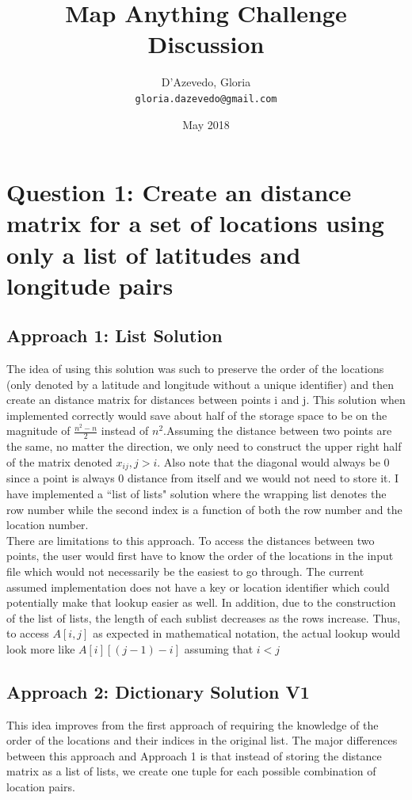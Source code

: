\documentclass{article}
\title{Map Anything Challenge Discussion}
\author{
  D'Azevedo, Gloria\\
  \texttt{gloria.dazevedo@gmail.com}\\
}
\date{May 2018}
\begin{document}
\maketitle

\section{Question 1: Create an distance matrix for a set of locations using only a list of latitudes and longitude pairs}
\subsection{Approach 1: List Solution}
The idea of using this solution was such to preserve the order of the locations (only denoted by a latitude and longitude without a unique identifier) and then create an distance matrix for distances between points i and j.  This solution when implemented correctly would save about half of the storage space to be on the magnitude of $\frac{n^2-n}{2}$ instead of $n^2$.Assuming the distance between two points are the same, no matter the direction, we only need to construct
the upper right half of the matrix denoted $x_{ij}, j>i$.  Also note that the diagonal would always be 0 since a point is always 0 distance from itself and we would not need to store it.  I have implemented a ``list of lists" solution where the wrapping list denotes the row number while the second index is a function of both the row number and the location number.  \\

There are limitations to this approach.  To access the distances between two points, the user would first have to know the order of the locations in the input file which would not necessarily be the easiest to go through.  The current assumed implementation does not have a key or location identifier which could potentially make that lookup easier as well.  In addition, due to the construction of the list of lists, the length of each sublist decreases as the rows increase.  Thus, to access $A[i,j]$ as expected in mathematical notation, the actual lookup would look more like $A[i][(j-1)-i]$ assuming that $i<j$

\subsection{Approach 2: Dictionary Solution V1}
This idea improves from the first approach of requiring the knowledge of the order of the locations and their indices in the original list.  The major differences between this approach and Approach 1 is that instead of storing the distance matrix as a list of lists, we create one tuple for each possible combination of location pairs. \\
\end{document}
